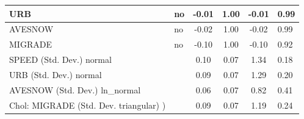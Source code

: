 \begin{table}
\begin{center}
\begin{tabular}{|l|l|c|c|c|l|}
			\hline
			URB & no & -0.01 & 1.00 & -0.01 & 0.99 \\
			\hline
			AVESNOW & no & -0.02 & 1.00 & -0.02 & 0.99 \\
			\hline
			MIGRADE & no & -0.10 & 1.00 & -0.10 & 0.92 \\
			\hline
			SPEED (Std. Dev.) normal &  & 0.10 & 0.07 & 1.34 & 0.18 \\
			\hline
			URB (Std. Dev.) normal &  & 0.09 & 0.07 & 1.29 & 0.20 \\
			\hline
			AVESNOW (Std. Dev.) ln_normal &  & 0.06 & 0.07 & 0.82 & 0.41 \\
			\hline
			 Chol: MIGRADE (Std. Dev. triangular) ) &  & 0.09 & 0.07 & 1.19 & 0.24 \\
			\hline
		\end{tabular}
	\end{center}
\end{table}